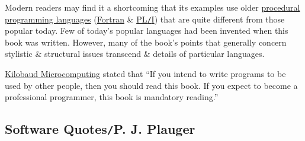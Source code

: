 \documentclass{article}
\begin{document}
Modern readers may find it a shortcoming that its examples use older \href{https://en.wikipedia.org/wiki/Procedural_programming_languages}{procedural programming languages} (\href{https://en.wikipedia.org/wiki/Fortran}{Fortran} \& \href{https://en.wikipedia.org/wiki/PL/I}{PL{\tt/}I}) that are quite different from those popular today. Few of today's popular languages had been invented when this book was written. However, many of the book's points that generally concern stylistic \& structural issues transcend \& details of particular languages.

\href{https://en.wikipedia.org/wiki/Kilobaud_Microcomputing}{Kilobaud Microcomputing} stated that ``If you intend to write programs to be used by other people, then you should read this book. If you expect to become a professional programmer, this book is mandatory reading.''

\subsection{Software Quotes{\tt/}P. J. Plauger}
\end{document}
